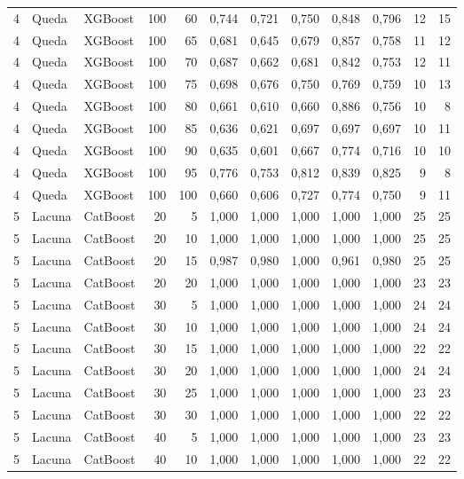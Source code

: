\begin{longtable}{@{}rllrrrrrrrrr@{}}
4 & Queda & XGBoost & 100 & 60 & 0,744 & 0,721 & 0,750 & 0,848 & 0,796 & 12 & 15 \\
4 & Queda & XGBoost & 100 & 65 & 0,681 & 0,645 & 0,679 & 0,857 & 0,758 & 11 & 12 \\
4 & Queda & XGBoost & 100 & 70 & 0,687 & 0,662 & 0,681 & 0,842 & 0,753 & 12 & 11 \\
4 & Queda & XGBoost & 100 & 75 & 0,698 & 0,676 & 0,750 & 0,769 & 0,759 & 10 & 13 \\
4 & Queda & XGBoost & 100 & 80 & 0,661 & 0,610 & 0,660 & 0,886 & 0,756 & 10 & 8 \\
4 & Queda & XGBoost & 100 & 85 & 0,636 & 0,621 & 0,697 & 0,697 & 0,697 & 10 & 11 \\
4 & Queda & XGBoost & 100 & 90 & 0,635 & 0,601 & 0,667 & 0,774 & 0,716 & 10 & 10 \\
4 & Queda & XGBoost & 100 & 95 & 0,776 & 0,753 & 0,812 & 0,839 & 0,825 & 9 & 8 \\
4 & Queda & XGBoost & 100 & 100 & 0,660 & 0,606 & 0,727 & 0,774 & 0,750 & 9 & 11 \\
5 & Lacuna & CatBoost & 20 & 5 & 1,000 & 1,000 & 1,000 & 1,000 & 1,000 & 25 & 25 \\
5 & Lacuna & CatBoost & 20 & 10 & 1,000 & 1,000 & 1,000 & 1,000 & 1,000 & 25 & 25 \\
5 & Lacuna & CatBoost & 20 & 15 & 0,987 & 0,980 & 1,000 & 0,961 & 0,980 & 25 & 25 \\
5 & Lacuna & CatBoost & 20 & 20 & 1,000 & 1,000 & 1,000 & 1,000 & 1,000 & 23 & 23 \\
5 & Lacuna & CatBoost & 30 & 5 & 1,000 & 1,000 & 1,000 & 1,000 & 1,000 & 24 & 24 \\
5 & Lacuna & CatBoost & 30 & 10 & 1,000 & 1,000 & 1,000 & 1,000 & 1,000 & 24 & 24 \\
5 & Lacuna & CatBoost & 30 & 15 & 1,000 & 1,000 & 1,000 & 1,000 & 1,000 & 22 & 22 \\
5 & Lacuna & CatBoost & 30 & 20 & 1,000 & 1,000 & 1,000 & 1,000 & 1,000 & 24 & 24 \\
5 & Lacuna & CatBoost & 30 & 25 & 1,000 & 1,000 & 1,000 & 1,000 & 1,000 & 23 & 23 \\
5 & Lacuna & CatBoost & 30 & 30 & 1,000 & 1,000 & 1,000 & 1,000 & 1,000 & 22 & 22 \\
5 & Lacuna & CatBoost & 40 & 5 & 1,000 & 1,000 & 1,000 & 1,000 & 1,000 & 23 & 23 \\
5 & Lacuna & CatBoost & 40 & 10 & 1,000 & 1,000 & 1,000 & 1,000 & 1,000 & 22 & 22 \\

\end{longtable}
